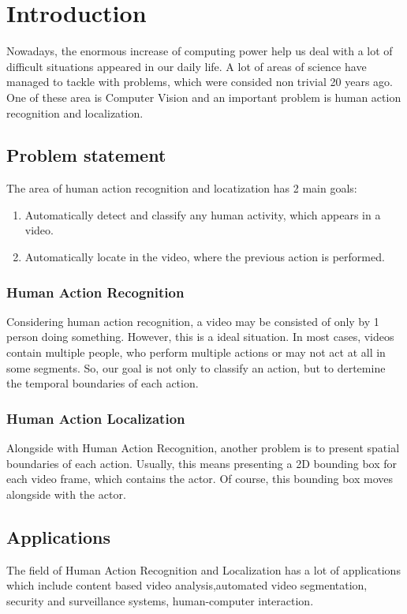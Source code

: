 \documentclass{report}
\begin{document}
\chapter{Introduction}
Nowadays, the enormous increase of computing power help us deal with a lot of difficult situations appeared in our daily life.
A lot of areas of science have managed to tackle with problems, which were consided non trivial 20 years ago. One of
these area is Computer Vision and an important problem is human action recognition and localization.
\section{Problem statement}
The area of human action recognition and locatization has 2 main goals:
\begin{enumerate}
\item Automatically detect and classify any human activity, which appears in a video.
\item Automatically locate in the video, where the previous action is performed.
\end{enumerate}

\subsection{Human Action Recognition}
Considering human action recognition, a video may be consisted of only by 1 person doing something. However, this is a ideal
situation. In most cases, videos contain multiple people, who perform multiple actions or may not act at all in some segments.
So, our goal is not only to classify an action, but to dertemine the temporal boundaries of each action.
\subsection{Human Action Localization}
Alongside with Human Action Recognition, another problem is to present spatial boundaries of each action. Usually, this means
presenting a 2D bounding box for each video frame, which contains the actor. Of course, this bounding box moves alongside with
the actor.

\section{Applications}
The field of Human Action Recognition and Localization has a lot of applications which include 
 content based video analysis,automated video segmentation, security and surveillance systems,
human-computer interaction.
\end{document}
